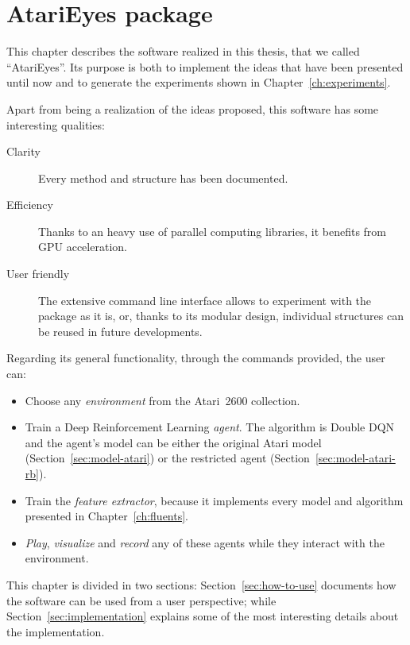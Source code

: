 \chapter{AtariEyes package}

\label{ch:atarieyes}

This chapter describes the software realized in this thesis, that we called
``AtariEyes''. Its purpose is both to implement the ideas that have been
presented until now and to generate the experiments shown in
Chapter~\ref{ch:experiments}.

Apart from being a realization of the ideas proposed, this software has some
interesting qualities:
\begin{description}
	\item [Clarity] Every method and structure has been documented.
	\item [Efficiency] Thanks to an heavy use of parallel computing libraries,
		it benefits from GPU acceleration.
	\item [User friendly] The extensive command line interface allows to
		experiment with the package as it is, or, thanks to its modular design,
		individual structures can be reused in future developments.
\end{description}

Regarding its general functionality, through the commands provided, the user
can:
\begin{itemize}
	\item Choose any \emph{environment} from the Atari~2600 collection.
	\item Train a Deep Reinforcement Learning \emph{agent}. The algorithm is
		Double DQN and the agent's model can be either the original Atari model
		(Section~\ref{sec:model-atari}) or the restricted agent
		(Section~\ref{sec:model-atari-rb}).
	\item Train the \emph{feature extractor}, because it implements every model
		and algorithm presented in Chapter~\ref{ch:fluents}.
	\item \emph{Play}, \emph{visualize} and \emph{record} any of these
		agents while they interact with the environment.
\end{itemize}

This chapter is divided in two sections: Section~\ref{sec:how-to-use}
documents how the software can be used from a user perspective;
while Section~\ref{sec:implementation} explains some of the most interesting
details about the implementation.


